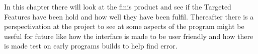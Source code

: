 In this chapter there will look at the finis product and see if the Targeted Features have been hold and how well they have been fulfil. Thereafter there is a perspectivation at the project to see at some aspects of the program might be useful for future like how the interface is made to be user friendly and how there is made test on early programs builds to help find error.